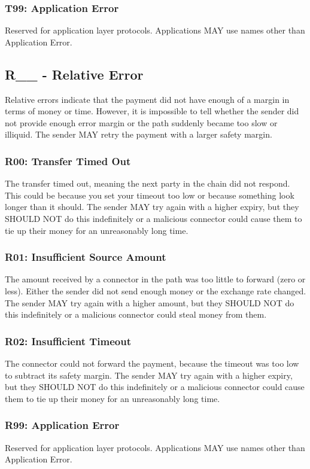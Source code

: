 \documentclass[11pt,twoside,a4paper]{article}
\begin{document}
\subsubsection{T99: Application Error}
Reserved for application layer protocols. Applications MAY use names other than Application Error.

\subsection{R\_\_ - Relative Error}
Relative errors indicate that the payment did not have enough of a margin in terms of money or time. However, it is impossible to tell whether the sender did not provide enough error margin or the path suddenly became too slow or illiquid. The sender MAY retry the payment with a larger safety margin.

\subsubsection{R00: Transfer Timed Out}
The transfer timed out, meaning the next party in the chain did not respond. This could be because you set your timeout too low or because something look longer than it should. The sender MAY try again with a higher expiry, but they SHOULD NOT do this indefinitely or a malicious connector could cause them to tie up their money for an unreasonably long time.

\subsubsection{R01: Insufficient Source Amount}
The amount received by a connector in the path was too little to forward (zero or less). Either the sender did not send enough money or the exchange rate changed. The sender MAY try again with a higher amount, but they SHOULD NOT do this indefinitely or a malicious connector could steal money from them.

\subsubsection{R02: Insufficient Timeout}
The connector could not forward the payment, because the timeout was too low to subtract its safety margin. The sender MAY try again with a higher expiry, but they SHOULD NOT do this indefinitely or a malicious connector could cause them to tie up their money for an unreasonably long time.

\subsubsection{R99: Application Error}
Reserved for application layer protocols. Applications MAY use names other than Application Error.



\end{document}
